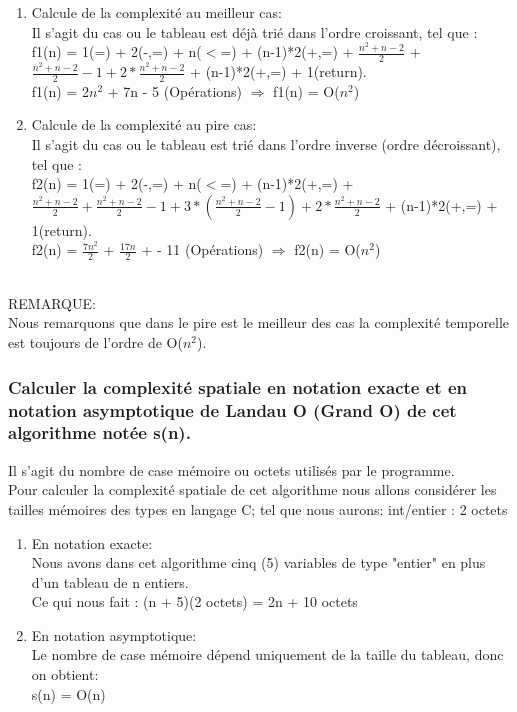 \documentclass[12pt]{article}
\begin{document}
 
\begin{enumerate}
	\item Calcule de la complexité au meilleur cas:
	\\
	Il s'agit du cas ou le tableau est déjà trié dans l'ordre croissant, tel que :
	\\
	f1(n) = 1(=) + 2(-,=) + n($<$=) + (n-1)*2(+,=) + $\frac{n^2+n-2}{2}$ + $\frac{n^2+n-2}{2}-1 + 2*\frac{n^2+n-2}{2}$ + (n-1)*2(+,=) + 1(return).
	\\ 
	\color{blue}
	f1(n) = 2$n^2$ + 7n - 5 (Opérations) $\Rightarrow$ f1(n) = O($n^2$)
	\color{black}
	\\
	\item Calcule de la complexité au pire cas:
	\\
	Il s'agit du cas ou le tableau est trié dans l'ordre inverse (ordre décroissant), tel que :\\
	f2(n) = 1(=) + 2(-,=) + n($<$=) + (n-1)*2(+,=) + $\frac{n^2+n-2}{2} + \frac{n^2+n-2}{2}-1 + 3*(\frac{n^2+n-2}{2}-1) + 2*\frac{n^2+n-2}{2}$ + (n-1)*2(+,=) + 1(return).
	\\

	\color{blue}
	f2(n) = $\frac{7n^2}{2}$ + $\frac{17n}{2}$ + - 11 (Opérations) $\Rightarrow$ f2(n) = O($n^2$)
	\color{black}
\end{enumerate}
\texttt{ }\\

\color{red}
REMARQUE:\\

\color{black}
Nous remarquons que dans le pire est le meilleur des cas la complexité temporelle est toujours de l'ordre de O($n^2$).


\subsubsection{Calculer la complexité spatiale en notation exacte et en notation asymptotique de Landau O (Grand O) de  cet  algorithme notée s(n).}
Il s'agit du nombre de case mémoire ou octets utilisés par le programme.
\\
Pour calculer la complexité spatiale de cet algorithme nous allons considérer les tailles mémoires des types en langage C; tel que nous aurons:
int/entier : 2 octets
\\
\begin{enumerate}
	\item En notation exacte:
	\\
Nous avons dans cet algorithme cinq (5) variables de type "entier" en plus d'un tableau de n entiers.
\\
Ce qui nous fait :
\color{blue}
 (n + 5)(2 octets) = 2n + 10 octets
\color{black}
\\
 
	\item En notation asymptotique:
	\\
	Le nombre de case mémoire dépend uniquement de la taille du tableau, donc on obtient:
	\\
	\color{blue}
	s(n) = O(n)
	\color{black}
	
	
\end{enumerate}
\end{document}
